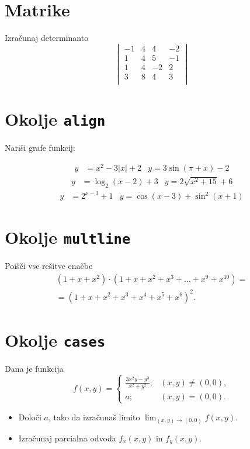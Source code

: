 \documentclass[a4paper,12pt]{article}
\begin{document}
\section*{Matrike}
Izračunaj determinanto
\[
\begin{vmatrix}
   
    -1 & 4 & 4 & -2 \\
    1 & 4 & 5 & -1 \\
    1 & 4 & -2 & 2 \\
    3 & 8 & 4 & 3 \\
\end{vmatrix}
\]


\section*{Okolje \texttt{align}}
Nariši grafe funkcij:

\begin{align*}
y &= x^2 - 3|x| + 2  &y = 3 \sin(\pi+x) - 2
\end{align*}
\begin{align*}
y &= \log_2(x-2) + 3  & y = 2 \sqrt{x^2+15} + 6
\end{align*}
\begin{align*}
y &= 2^{x-3} + 1&y = \cos(x-3) + \sin^2(x+1)
\end{align*}


\section*{Okolje \texttt{multline}}
Poišči vse rešitve enačbe
\begin{multline*}
(1+x+x^2) \cdot (1+x+x^2+x^3+\ldots+x^9+x^{10}) = \\
=(1+x+x^2+x^3+x^4+x^5+x^6)^2.
\end{multline*}

\section*{Okolje \texttt{cases}}
Dana je funkcija
\[
f(x, y) = 
\begin{cases}
    \frac{3x^2y - y^3}{x^2 + y^2}; & (x, y) \neq (0, 0), \\
    a; & (x, y) = (0, 0).
\end{cases}
\]
\begin{itemize}
\item Določi \(a\), tako da izračunaš limito \( \lim_{(x,y)\to(0,0)} f(x,y) \).
\item Izračunaj parcialna odvoda \(f_x(x,y)\) in \(f_y(x,y)\).
\end{itemize}
\end{document}
